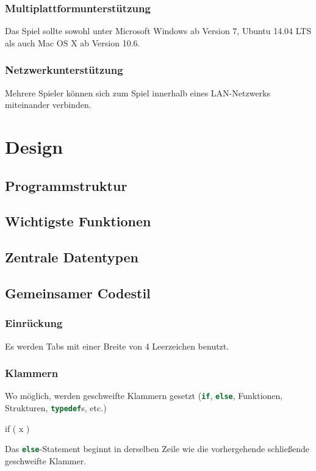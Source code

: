 \documentclass{homework-pp}
\renewcommand{\c}[1]{\lstinline[language=c,basicstyle=\ttfamily]|#1|}
\begin{document}
\subsubsection{Multiplattformunterstützung}
Das Spiel sollte sowohl unter Microsoft Windows ab Version 7, Ubuntu 14.04 LTS als auch Mac OS X ab Version 10.6.
\subsubsection{Netzwerkunterstützung}
Mehrere Spieler können sich zum Spiel innerhalb eines LAN-Netzwerks miteinander verbinden.

\section{Design}

\subsection{Programmstruktur}
\subsection{Wichtigste Funktionen}
\subsection{Zentrale Datentypen}
\subsection{Gemeinsamer Codestil}

\subsubsection{Einrückung}

Es werden Tabs mit einer Breite von 4 Leerzeichen benutzt.

\subsubsection{Klammern}

Wo möglich, werden geschweifte Klammern gesetzt (\c{if}, \c{else}, Funktionen, Strukturen, \c{typedef}s, etc.)

\begin{cblock}
if ( x ) {

}
\end{cblock}

Das \c{else}-Statement beginnt in derselben Zeile wie die vorhergehende schließende geschweifte Klammer.
\end{document}
